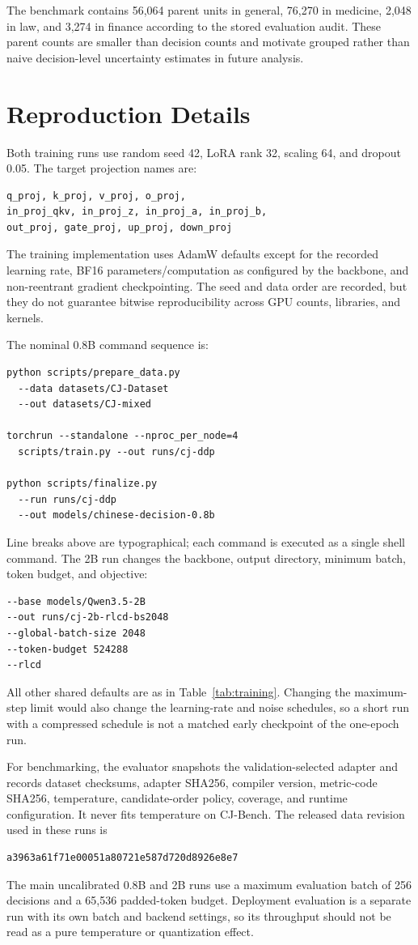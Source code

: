 The benchmark contains 56,064 parent units in general, 76,270 in medicine, 2,048 in law, and 3,274 in finance according to the stored evaluation audit. These parent counts are smaller than decision counts and motivate grouped rather than naive decision-level uncertainty estimates in future analysis.

\section{Reproduction Details}
\label{app:reproduce}
Both training runs use random seed 42, LoRA rank 32, scaling 64, and dropout 0.05. The target projection names are:
\begin{lstlisting}
q_proj, k_proj, v_proj, o_proj,
in_proj_qkv, in_proj_z, in_proj_a, in_proj_b,
out_proj, gate_proj, up_proj, down_proj
\end{lstlisting}
The training implementation uses AdamW defaults except for the recorded learning rate, BF16 parameters/computation as configured by the backbone, and non-reentrant gradient checkpointing. The seed and data order are recorded, but they do not guarantee bitwise reproducibility across GPU counts, libraries, and kernels.

The nominal 0.8B command sequence is:
\begin{lstlisting}
python scripts/prepare_data.py 
  --data datasets/CJ-Dataset
  --out datasets/CJ-mixed

torchrun --standalone --nproc_per_node=4
  scripts/train.py --out runs/cj-ddp

python scripts/finalize.py
  --run runs/cj-ddp
  --out models/chinese-decision-0.8b
\end{lstlisting}
Line breaks above are typographical; each command is executed as a single shell command. The 2B run changes the backbone, output directory, minimum batch, token budget, and objective:
\begin{lstlisting}
--base models/Qwen3.5-2B
--out runs/cj-2b-rlcd-bs2048
--global-batch-size 2048
--token-budget 524288
--rlcd
\end{lstlisting}
All other shared defaults are as in Table~\ref{tab:training}. Changing the maximum-step limit would also change the learning-rate and noise schedules, so a short run with a compressed schedule is not a matched early checkpoint of the one-epoch run.

For benchmarking, the evaluator snapshots the validation-selected adapter and records dataset checksums, adapter SHA256, compiler version, metric-code SHA256, temperature, candidate-order policy, coverage, and runtime configuration. It never fits temperature on CJ-Bench. The released data revision used in these runs is
\begin{lstlisting}
a3963a61f71e00051a80721e587d720d8926e8e7
\end{lstlisting}
The main uncalibrated 0.8B and 2B runs use a maximum evaluation batch of 256 decisions and a 65,536 padded-token budget. Deployment evaluation is a separate run with its own batch and backend settings, so its throughput should not be read as a pure temperature or quantization effect.

